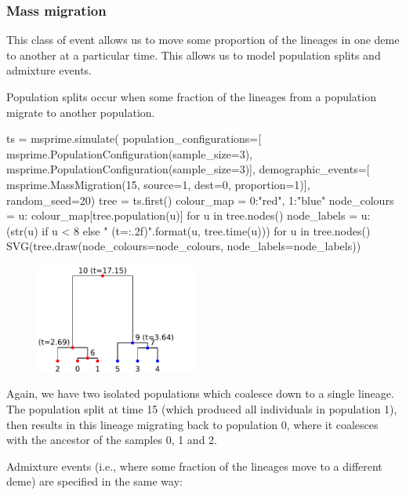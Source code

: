 \documentclass[graybox]{svmult}
\newcommand{\includenbimage}[1]{\begin{center}\texttt{[image: \#1]}\end{center}}
\begin{document}
\subsubsection{Mass migration}\label{mass-migration}

This class of event allows us to move some proportion of the lineages in
one deme to another at a particular time. This allows us to model
population splits and admixture events.

Population splits occur when some fraction of the lineages from a
population migrate to another population.

\begin{pythoncode}
ts  = msprime.simulate(
    population_configurations=[
        msprime.PopulationConfiguration(sample_size=3),
        msprime.PopulationConfiguration(sample_size=3)],
    demographic_events=[
        msprime.MassMigration(15, source=1, dest=0, proportion=1)],
    random_seed=20)
tree = ts.first()
colour_map = {0:"red", 1:"blue"}
node_colours = {u: colour_map[tree.population(u)] for u in tree.nodes()}
node_labels = {
    u: (str(u) if u < 8 else "{} (t={:.2f})".format(u, tree.time(u)))
    for u in tree.nodes()}
SVG(tree.draw(node_colours=node_colours, node_labels=node_labels))
\end{pythoncode}


\begin{figure}
  \begin{center}
    \includegraphics[width=0.48\textwidth]{images/simulations_37_0.pdf}
  \end{center}
\end{figure}


Again, we have two isolated populations which coalesce down to a single
lineage. The population split at time 15 (which produced all individuals
in population 1), then results in this lineage migrating back to
population 0, where it coalesces with the ancestor of the samples 0, 1
and 2.

Admixture events (i.e., where some fraction of the lineages move to a
different deme) are specified in the same way:
\end{document}
